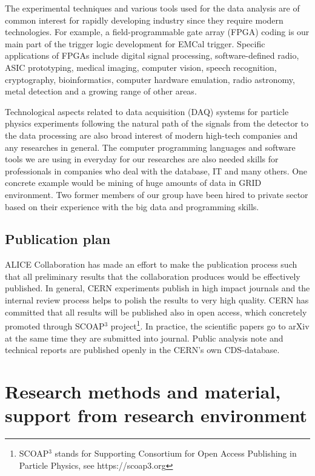 The experimental techniques and various tools used for the data analysis are of common interest for rapidly developing industry since they require modern technologies. For example, a field-programmable gate array (FPGA) coding is our main part of the trigger logic development for EMCal trigger. Specific applications of FPGAs include digital signal processing, software-defined radio, ASIC prototyping, medical imaging, computer vision, speech recognition, cryptography, bioinformatics, computer hardware emulation, radio astronomy, metal detection and a growing range of other areas.

Technological aspects related to data acquisition (DAQ) systems for particle physics experiments following the natural path of the signals from the detector to the data processing are also broad interest of modern high-tech companies and any researches in general. The computer programming languages and software tools we are using in everyday for our researches are also needed skills for professionals in companies  who deal with the database, IT and many others. One concrete example would be mining of huge amounts of data in GRID environment. Two former members of our group have been hired to private sector based on their experience with the big data and programming skills.

\subsection{Publication plan}

ALICE Collaboration has made an effort to make the publication process such that all preliminary results that the collaboration produces would be effectively published. In general, CERN experiments publish in high impact journals and the internal review process helps to polish the results to very high quality. CERN has committed that all results will be published also in open access, which concretely promoted through SCOAP$^3$ project\footnote{SCOAP$^3$ stands for Supporting Consortium for Open Access Publishing in Particle Physics, see https://scoap3.org}. In practice, the scientific papers go to arXiv at the same time they are submitted into journal. Public analysis note and technical reports are published openly in the CERN's own CDS-database.

\section{Research methods and material, support from research environment} %
\label{sec:researchmethods}

